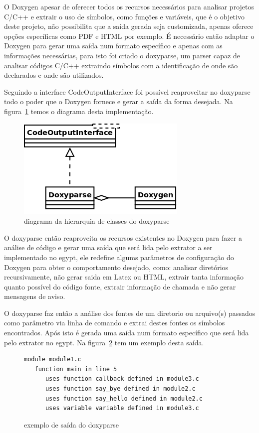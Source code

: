 O Doxygen apesar de oferecer todos os recursos necessários para
analisar projetos C/C++ e extrair o uso de símbolos, como funções e variáveis,
que é o objetivo deste projeto, não possibilita que a saída gerada seja
customizada, apenas oferece opções específicas como PDF e HTML por exemplo. É
necessário então adaptar o Doxygen para gerar uma saída num formato
específico e apenas com as informações necessárias, para isto foi criado o
doxyparse, um parser capaz de analisar códigos C/C++ extraindo símbolos
com a identificação de onde são declarados e onde são utilizados.

Seguindo a interface CodeOutputInterface foi possível reaproveitar no doxyparse
todo o poder que o Doxygen fornece e gerar a saída da forma desejada. Na
figura~\ref{doxyparse-diagram} temos o diagrama desta implementação.

\begin{figure}[h]
\center
\includegraphics[scale=0.4]{imagens/doxyparse-diagram}
\caption{diagrama da hierarquia de classes do doxyparse}
\label{doxyparse-diagram}
\end{figure}

O doxyparse então reaproveita os recursos existentes no Doxygen para fazer a
análise de código e gerar uma saída que será lida pelo extrator a ser
implementado no egypt, ele redefine algums parâmetros de configuração
do Doxygen para obter o comportamento desejado, como: analisar diretórios
recursivamente, não gerar saida em Latex ou HTML, extrair tanta informação
quanto possível do código fonte, extrair informação de chamada e não gerar
mensagens de aviso.

O doxyparse faz então a análise dos fontes de um diretorio ou arquivo(s)
passados como parâmetro via linha de comando e extrai destes fontes os símbolos
encontrados. Após isto é gerada uma saída num formato específico que será lida
pelo extrator no egypt. Na figura~\ref{exemplo-saida-doxyparse} tem um exemplo
desta saída.

\begin{figure}[h]
\begin{Verbatim}[frame=single,fontsize=\relsize{-2},fontfamily=courier]
module module1.c
   function main in line 5
      uses function callback defined in module3.c
      uses function say_bye defined in module2.c
      uses function say_hello defined in module2.c
      uses variable variable defined in module3.c
\end{Verbatim}
\caption{exemplo de saída do doxyparse}
\label{exemplo-saida-doxyparse}
\end{figure}

